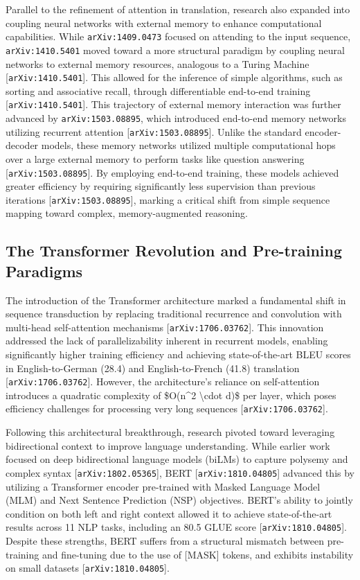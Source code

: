 \documentclass[11pt]{article}
\begin{document}
Parallel to the refinement of attention in translation, research also expanded into coupling neural networks with external memory to enhance computational capabilities. While \texttt{arXiv:1409.0473} focused on attending to the input sequence, \texttt{arXiv:1410.5401} moved toward a more structural paradigm by coupling neural networks to external memory resources, analogous to a Turing Machine [\texttt{arXiv:1410.5401}]. This allowed for the inference of simple algorithms, such as sorting and associative recall, through differentiable end-to-end training [\texttt{arXiv:1410.5401}]. This trajectory of external memory interaction was further advanced by \texttt{arXiv:1503.08895}, which introduced end-to-end memory networks utilizing recurrent attention [\texttt{arXiv:1503.08895}]. Unlike the standard encoder-decoder models, these memory networks utilized multiple computational hops over a large external memory to perform tasks like question answering [\texttt{arXiv:1503.08895}]. By employing end-to-end training, these models achieved greater efficiency by requiring significantly less supervision than previous iterations [\texttt{arXiv:1503.08895}], marking a critical shift from simple sequence mapping toward complex, memory-augmented reasoning.

\subsection{The Transformer Revolution and Pre-training Paradigms}

The introduction of the Transformer architecture marked a fundamental shift in sequence transduction by replacing traditional recurrence and convolution with multi-head self-attention mechanisms [\texttt{arXiv:1706.03762}]. This innovation addressed the lack of parallelizability inherent in recurrent models, enabling significantly higher training efficiency and achieving state-of-the-art BLEU scores in English-to-German (28.4) and English-to-French (41.8) translation [\texttt{arXiv:1706.03762}]. However, the architecture's reliance on self-attention introduces a quadratic complexity of \$O(n\textasciicircum{}2 \textbackslash{}cdot d)\$ per layer, which poses efficiency challenges for processing very long sequences [\texttt{arXiv:1706.03762}].

Following this architectural breakthrough, research pivoted toward leveraging bidirectional context to improve language understanding. While earlier work focused on deep bidirectional language models (biLMs) to capture polysemy and complex syntax [\texttt{arXiv:1802.05365}], BERT [\texttt{arXiv:1810.04805}] advanced this by utilizing a Transformer encoder pre-trained with Masked Language Model (MLM) and Next Sentence Prediction (NSP) objectives. BERT's ability to jointly condition on both left and right context allowed it to achieve state-of-the-art results across 11 NLP tasks, including an 80.5 GLUE score [\texttt{arXiv:1810.04805}]. Despite these strengths, BERT suffers from a structural mismatch between pre-training and fine-tuning due to the use of [MASK] tokens, and exhibits instability on small datasets [\texttt{arXiv:1810.04805}].
\end{document}
